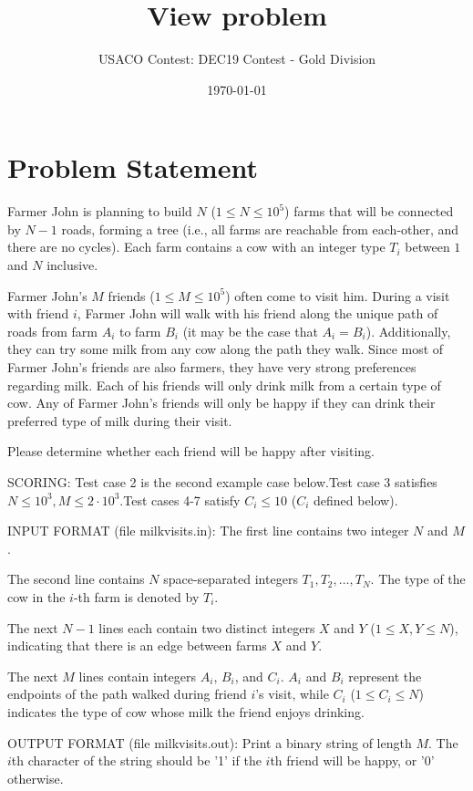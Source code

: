 \documentclass[12pt]{article}
\title{View problem}
\author{USACO Contest: DEC19 Contest - Gold Division}
\date{\today}
\begin{document}
\maketitle

\section*{Problem Statement}

Farmer John is planning to build $N$ ($1 \leq N \leq 10^5$) farms that will be
connected by $N-1$ roads, forming a tree (i.e., all farms are reachable from
each-other, and there are no cycles). Each farm contains a cow with an integer
type $T_i$ between $1$ and $N$ inclusive.

Farmer John's $M$ friends ($1 \leq M \leq 10^5$) often come to visit him. During
a visit with friend $i$, Farmer John will walk with his friend along the unique
path of roads from farm $A_i$ to farm $B_i$ (it may be the case that
$A_i = B_i$). Additionally, they can try some milk from any cow along the path
they walk. Since most of Farmer John's friends are also farmers, they have very
strong preferences regarding milk. Each of his friends will only drink milk from
a  certain type of cow. Any of Farmer John's friends will only be happy if they
can drink their preferred type of milk during their visit.

Please determine whether each friend will be happy after visiting.

SCORING:
Test case 2 is the second example case below.Test case 3 satisfies $N\le 10^3, M\le 2\cdot 10^3$.Test cases 4-7 satisfy $C_i\le 10$ ($C_i$ defined below).

INPUT FORMAT (file milkvisits.in):
The first line contains two integer $N$ and $M$. 

The second line contains $N$ space-separated integers $T_1,T_2,\ldots, T_N.$ The
type of the cow in the $i$-th farm is denoted by $T_i.$

The next $N-1$ lines each contain two distinct integers $X$ and $Y$ 
($1 \leq X, Y \leq N$), indicating that there is an edge between farms $X$ and
$Y$. 

The next $M$ lines contain integers $A_i$, $B_i$, and $C_i$. $A_i$ and $B_i$
represent the endpoints of the path walked during friend $i$'s visit, while
$C_i$ ($1\le C_i\le N$) indicates the type of cow whose milk the friend enjoys
drinking.

OUTPUT FORMAT (file milkvisits.out):
Print a binary string of length $M.$ The $i$th character of the string should be
'1' if the $i$th friend will be happy, or '0' otherwise.
\end{document}
